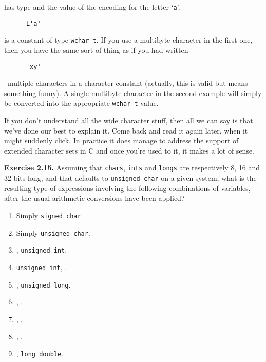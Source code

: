     has type \kchar{} and the value of the encoding for the
     letter `\texttt{a}'.


    \begin{Verbatim}
      L'a'
    \end{Verbatim}

    is a constant of type \texttt{wchar\_t}. If you use a multibyte
     character in the first one, then you have the same sort of thing as if
     you had written


    \begin{Verbatim}
      'xy'
    \end{Verbatim}

    --multiple characters in a character constant (actually, this is
     valid but means something funny). A single multibyte character in the
     second example will simply be converted into the appropriate
     \texttt{wchar\_t} value.


    If you don't understand all the wide character stuff, then all we can
     say is that we've done our best to explain it. Come back and read it
     again later, when it might suddenly click. In practice it does manage to
     address the support of extended character sets in C and once you're
     used to it, it makes a lot of sense.


   

   

    \textbf{Exercise 2.15.} Assuming that \texttt{chars}, \texttt{ints} and
      \texttt{longs} are respectively 8, 16 and 32 bits
      long, and that \kchar{} defaults to \texttt{unsigned char}
      on a given system, what is the resulting type of expressions involving
      the following combinations of variables, after the usual arithmetic
      conversions have been applied?

      \begin{enumerate}
      \item Simply \texttt{signed char}.
      \item Simply \texttt{unsigned char}.
      \item \kint, \texttt{unsigned int}.
      \item \texttt{unsigned int}, \klong.
      \item \kint, \texttt{unsigned long}.
      \item \kchar, \klong.
      \item \kchar, \float.
      \item \float, \float.
      \item \float, \texttt{long double}.
     \end{enumerate}

